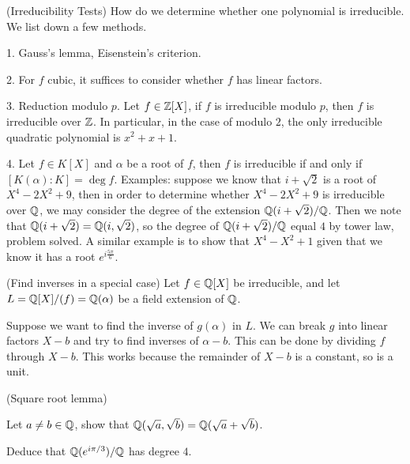 \begin{remark}{(Irreducibility Tests)}
    How do we determine whether one polynomial is irreducible. We list down a few methods.

    1. Gauss's lemma, Eisenstein's criterion.

    2. For $f$ cubic, it suffices to consider whether $f$ has linear factors.

    3. Reduction modulo $p$. Let $f \in \mathbb{Z}[X]$, if $f$ is irreducible modulo $p$, then $f$ is irreducible over $\mathbb{Z}$.
    In particular, in the case of modulo $2$, the only irreducible quadratic polynomial is $x^2 + x + 1$.

    4. Let $f \in K[X]$ and $\alpha$ be a root of $f$, then $f$ is irreducible if and only if $[K(\alpha) : K] = \deg f$.
    Examples: suppose we know that $i + \sqrt{2}$ is a root of $X^4 - 2X^2 + 9$, then in order to determine whether $X^4 - 2X^2 + 9$ is irreducible over $\mathbb{Q}$, we may consider the degree of the extension $\mathbb{Q}(i + \sqrt{2})/\mathbb{Q}$. Then we note that $\mathbb{Q}(i + \sqrt{2}) = \mathbb{Q}(i,\sqrt{2})$, so the degree of $\mathbb{Q}(i + \sqrt{2})/\mathbb{Q}$ equal $4$ by tower law, problem solved. A similar example is to show that $X^4 - X^2 + 1$ given that we know it has a root $e^{i\frac{5\pi}{6}}$.
\end{remark}

\begin{remark}{(Find inverses in a special case)}
    Let $f \in \mathbb{Q}[X]$ be irreducible, and let $L = \mathbb{Q}[X]/(f) = \mathbb{Q}(\alpha)$ be a field extension of $\mathbb{Q}$.

    Suppose we want to find the inverse of $g(\alpha)$ in $L$. We can break $g$ into linear factors $X - b$ and try to find inverses of $\alpha - b$. This can be done by dividing $f$ through $X-b$. This works because the remainder of $X-b$ is a constant, so is a unit.
\end{remark}

\begin{question}{(Square root lemma)}

	Let $a \not = b \in \mathbb{Q}$, show that $\mathbb{Q}(\sqrt{a}, \sqrt{b}) = \mathbb{Q}(\sqrt{a} + \sqrt{b})$. 
	
	Deduce that $\mathbb{Q}(e^{i\pi/3})/\mathbb{Q}$ has degree $4$. 
\end{question}
